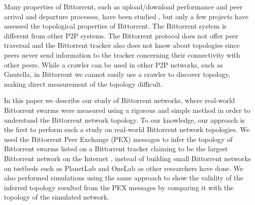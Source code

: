 \documentclass[10pt,conference,letterpaper,final]{IEEEtran}
\begin{document}
Many properties of Bittorrent, such as upload/download performance and peer arrival and departure processes, have been studied \cite{guo2005measurements}, but only a few projects have assessed the topological properties of Bittorrent.
The Bittorrent system is different from other P2P systems.
The Bittorrent protocol does not offer peer traversal and the Bittorrent tracker also does not know about topologies since peers never send information to the tracker concerning their connectivity with other peers. 
While a crawler can be used in other P2P networks, such as Gnutella, in Bittorrent we cannot easily use a crawler to discover topology, making direct measurement of the topology difficult.

In this paper we describe our study of Bittorrent networks, where real-world Bittorrent swarms were measured using a rigorous and simple method in order to understand the Bittorrent network topology. 
To our knowledge, our approach is the first to perform such a study on real-world Bittorrent network topologies. 
We used the Bittorrent Peer Exchange (PEX) messages to infer the topology of Bittorrent swarms listed on a Bittorrent tracker claiming to be the largest Bittorrent network on the Internet  \cite{piratebay}\cite{zhang2010unraveling}, instead of building small Bittorrent networks on testbeds such as PlanetLab and OneLab as other researchers have done. 
We also performed simulations using the same approach to show the validity of the inferred topology  resulted from the PEX messages by comparing it with the topology of the simulated network.
\end{document}
